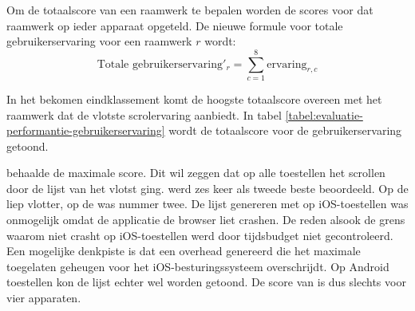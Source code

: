Om de totaalscore van een raamwerk te bepalen worden de scores voor dat raamwerk op ieder apparaat opgeteld. De nieuwe formule voor totale gebruikerservaring voor een raamwerk $r$ wordt:
\begin{equation}
  \text{Totale gebruikerservaring}'_r = \sum_{c=1}^{8}{\text{ervaring}_{r,c}}
  \label{eq:performantie-gebruikservaring}
\end{equation}

In het bekomen eindklassement komt de hoogste totaalscore overeen met het raamwerk dat de vlotste scrolervaring aanbiedt. In tabel \ref{tabel:evaluatie-performantie-gebruikerservaring} wordt de totaalscore voor de gebruikerservaring getoond.

\begin{table}[H]
\centering
{}
\caption{Gebruikerservaring voor \st{}~(\sta), \kendo{}~(\kendoa), \jqm{}~(\jqma) en \lungo{}~(\lungoa).}
\label{tabel:evaluatie-performantie-gebruikerservaring}
\end{table}

\st{} behaalde de maximale score.
Dit wil zeggen dat op alle toestellen het scrollen door de lijst van \st{} het vlotst ging.
\jqm{} werd zes keer als tweede beste beoordeeld. 
Op de \htc{} liep \kendo{} vlotter,  op de \ipadi{} was \lungo{} nummer twee.
De lijst genereren met \kendo{} op iOS-toestellen was onmogelijk omdat de applicatie de browser liet crashen.
De reden alsook de grens waarom \kendo{} niet crasht op iOS-toestellen werd door tijdsbudget niet gecontroleerd.
Een mogelijke denkpiste is dat \kendo{} een overhead genereerd die het maximale toegelaten geheugen voor het iOS-besturingssysteem overschrijdt.
Op Android toestellen kon de \kendo{} lijst echter wel worden getoond.
De score van \kendo{} is dus slechts voor vier apparaten.


